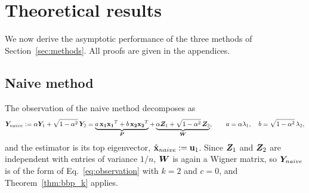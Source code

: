 \section{Theoretical results}\label{sec:theory}
We now derive the asymptotic performance of the three methods of Section~\ref{sec:methods}. All proofs are given in the appendices.

\subsection{Naive method}\label{sec:naive}
The observation of the naive method decomposes as
\begin{equation}
    \bm{Y}_{naive} := \alpha \bm{Y}_1 + \sqrt{1-\alpha^2}\, \bm{Y}_2
    = \underbrace{a\,\boldsymbol{\mathbf{x_1}}\boldsymbol{\mathbf{x_1}}^T + b\,\boldsymbol{\mathbf{x_2}}\boldsymbol{\mathbf{x_2}}^T}_{\bm{P}}
    + \underbrace{\alpha \bm{Z}_1 + \sqrt{1-\alpha^2}\,\bm{Z}_2}_{\bm{W}},
    \qquad a = \alpha\lambda_1, \quad b = \sqrt{1-\alpha^2}\,\lambda_2,
    \label{eq:2spikes}
\end{equation}
and the estimator is its top eigenvector, $\hat{\boldsymbol{\mathbf{x}}}_{naive} := \boldsymbol{\mathbf{u}}_1$. Since $\bm{Z}_1$ and $\bm{Z}_2$ are independent with entries of variance $1/n$, $\bm{W}$ is again a Wigner matrix, so $\bm{Y}_{naive}$ is of the form of Eq.~\eqref{eq:observation} with $k = 2$ and $c = 0$, and Theorem~\ref{thm:bbp_k} applies.

